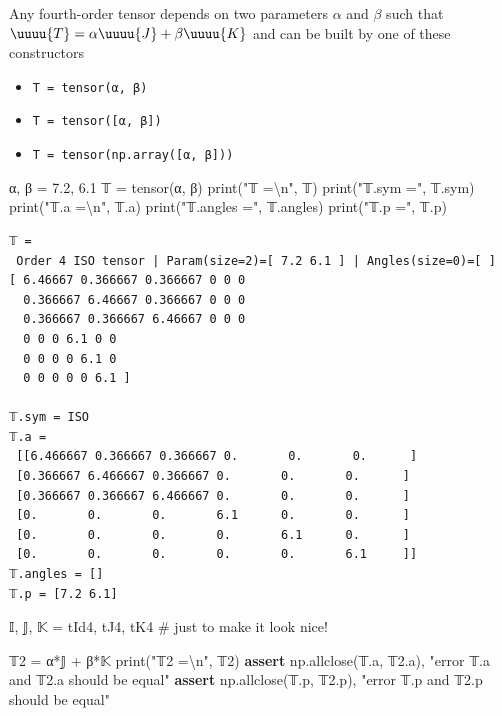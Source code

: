 \documentclass[
  letterpaper,
  DIV=11,
  numbers=noendperiod]{scrreprt}
\newenvironment{Shaded}{\begin{snugshade}}{\end{snugshade}}
\newcommand{\BuiltInTok}[1]{\textcolor[rgb]{0.00,0.23,0.31}{#1}}
\newcommand{\CharTok}[1]{\textcolor[rgb]{0.13,0.47,0.30}{#1}}
\newcommand{\CommentTok}[1]{\textcolor[rgb]{0.37,0.37,0.37}{#1}}
\newcommand{\ControlFlowTok}[1]{\textcolor[rgb]{0.00,0.23,0.31}{\textbf{#1}}}
\newcommand{\DecValTok}[1]{\textcolor[rgb]{0.68,0.00,0.00}{#1}}
\newcommand{\ErrorTok}[1]{\textcolor[rgb]{0.68,0.00,0.00}{#1}}
\newcommand{\FloatTok}[1]{\textcolor[rgb]{0.68,0.00,0.00}{#1}}
\newcommand{\NormalTok}[1]{\textcolor[rgb]{0.00,0.23,0.31}{#1}}
\newcommand{\OperatorTok}[1]{\textcolor[rgb]{0.37,0.37,0.37}{#1}}
\newcommand{\StringTok}[1]{\textcolor[rgb]{0.13,0.47,0.30}{#1}}
\providecommand{\tightlist}{%
  \setlength{\itemsep}{0pt}\setlength{\parskip}{0pt}}\usepackage{longtable,booktabs,array}
\begin{document}
Any fourth-order tensor depends on two parameters \(\alpha\) and
\(\beta\) such that \(\uuuu{T}=\alpha \uuuu{J} + \beta \uuuu{K}\) and
can be built by one of these constructors

\begin{itemize}
\tightlist
\item
  \texttt{T\ =\ tensor(α,\ β)}
\item
  \texttt{T\ =\ tensor({[}α,\ β{]})}
\item
  \texttt{T\ =\ tensor(np.array({[}α,\ β{]}))}
\end{itemize}

\begin{Shaded}
\begin{Highlighting}[]
\NormalTok{α, β }\OperatorTok{=} \FloatTok{7.2}\NormalTok{, }\FloatTok{6.1}
\NormalTok{𝕋 }\OperatorTok{=}\NormalTok{ tensor(α, β)}
\BuiltInTok{print}\NormalTok{(}\StringTok{"𝕋 =}\CharTok{\textbackslash{}n}\StringTok{"}\NormalTok{, 𝕋)}
\BuiltInTok{print}\NormalTok{(}\StringTok{"𝕋.sym ="}\NormalTok{, 𝕋.sym)}
\BuiltInTok{print}\NormalTok{(}\StringTok{"𝕋.a =}\CharTok{\textbackslash{}n}\StringTok{"}\NormalTok{, 𝕋.a)}
\BuiltInTok{print}\NormalTok{(}\StringTok{"𝕋.angles ="}\NormalTok{, 𝕋.angles)}
\BuiltInTok{print}\NormalTok{(}\StringTok{"𝕋.p ="}\NormalTok{, 𝕋.p)}
\end{Highlighting}
\end{Shaded}

\begin{verbatim}
𝕋 =
 Order 4 ISO tensor | Param(size=2)=[ 7.2 6.1 ] | Angles(size=0)=[ ]
[ 6.46667 0.366667 0.366667 0 0 0 
  0.366667 6.46667 0.366667 0 0 0 
  0.366667 0.366667 6.46667 0 0 0 
  0 0 0 6.1 0 0 
  0 0 0 0 6.1 0 
  0 0 0 0 0 6.1 ]

𝕋.sym = ISO
𝕋.a =
 [[6.466667 0.366667 0.366667 0.       0.       0.      ]
 [0.366667 6.466667 0.366667 0.       0.       0.      ]
 [0.366667 0.366667 6.466667 0.       0.       0.      ]
 [0.       0.       0.       6.1      0.       0.      ]
 [0.       0.       0.       0.       6.1      0.      ]
 [0.       0.       0.       0.       0.       6.1     ]]
𝕋.angles = []
𝕋.p = [7.2 6.1]
\end{verbatim}

\begin{Shaded}
\begin{Highlighting}[]
\NormalTok{𝕀, 𝕁, 𝕂 }\OperatorTok{=}\NormalTok{ tId4, tJ4, tK4 }\CommentTok{\# just to make it look nice!}

\NormalTok{𝕋}\DecValTok{2} \OperatorTok{=}\NormalTok{ α}\OperatorTok{*}\NormalTok{𝕁 }\OperatorTok{+}\NormalTok{ β}\OperatorTok{*}\NormalTok{𝕂}
\BuiltInTok{print}\NormalTok{(}\StringTok{"𝕋2 =}\CharTok{\textbackslash{}n}\StringTok{"}\NormalTok{, 𝕋}\DecValTok{2}\NormalTok{)}
\ControlFlowTok{assert}\NormalTok{ np.allclose(𝕋.a, 𝕋}\FloatTok{2.}\ErrorTok{a}\NormalTok{), }\StringTok{"error 𝕋.a and 𝕋2.a should be equal"}
\ControlFlowTok{assert}\NormalTok{ np.allclose(𝕋.p, 𝕋}\FloatTok{2.}\ErrorTok{p}\NormalTok{), }\StringTok{"error 𝕋.p and 𝕋2.p should be equal"}
\end{Highlighting}
\end{Shaded}
\end{document}
